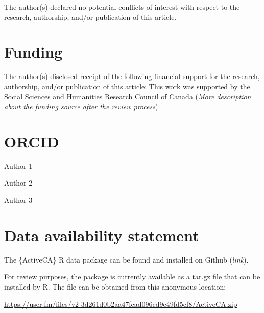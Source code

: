 \documentclass[Royal,times,sageh]{sagej}
\begin{document}
The author(s) declared no potential conflicts of interest with respect
to the research, authorship, and/or publication of this article.

\section{Funding}\label{funding}

The author(s) disclosed receipt of the following financial support for
the research, authorship, and/or publication of this article: This work
was supported by the Social Sciences and Humanities Research Council of
Canada (\emph{More description about the funding source after the review
process}).

\section{ORCID}\label{orcid}

Author 1

Author 2

Author 3

\section{Data availability statement}\label{data-availability-statement}

The \{ActiveCA\} R data package can be found and installed on Github
(\emph{link}).

For review purposes, the package is currently available as a tar.gz file
that can be installed by R. The file can be obtained from this anonymous
location:

\url{https://user.fm/files/v2-3d261d0b2aa47fcad096cd9e49fd5cf8/ActiveCA.zip}



\end{document}
